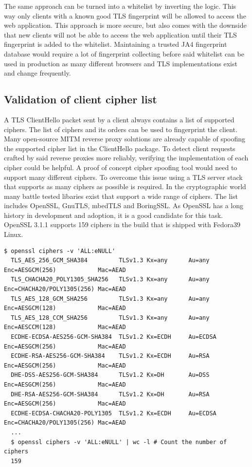 \documentclass[12pt]{scrbook}
\begin{document}
The same approach can be turned into a whitelist by inverting the logic. This
way only clients with a known good TLS fingerprint will be allowed to access the
web application. This approach is more secure, but also comes with the downside
that new clients will not be able to access the web application until their TLS
fingerprint is added to the whitelist. Maintaining a trusted JA4 fingerprint
database would require a lot of fingerprint collecting before said whitelist can
be used in production as many different browsers and TLS implementations exist
and change frequently.

\newpage \subsection{Validation of client cipher list} A TLS ClientHello packet sent
by a client always contains a list of supported ciphers. The list of ciphers
and its orders can be used to fingerprint the client. Many open-source MITM
reverse proxy solutions are already capable of spoofing the supported cipher
list in the ClientHello package. To detect client requests crafted by said reverse
proxies more reliably, verifying the implementation of each cipher could be
helpful. A proof of concept cipher spoofing tool would need to support many
different ciphers. To overcome this issue using a TLS server stack that
supports as many ciphers as possible is required. In the cryptographic world many battle tested
libaries exist that support a wide range of ciphers. The list includes OpenSSL, GnuTLS, mbedTLS and BoringSSL.
As OpenSSL has a long history in development and adoption, it is a good candidate for this task.
OpenSSL 3.1.1 supports 159 ciphers in the build that is shipped with Fedora39 Linux.

\begin{lstlisting}[breaklines=true,basicstyle=\tiny,caption={Listing supported ciphers and counting them in a shell},captionpos=b]
  $ openssl ciphers -v 'ALL:eNULL'
  TLS_AES_256_GCM_SHA384         TLSv1.3 Kx=any      Au=any   Enc=AESGCM(256)            Mac=AEAD
  TLS_CHACHA20_POLY1305_SHA256   TLSv1.3 Kx=any      Au=any   Enc=CHACHA20/POLY1305(256) Mac=AEAD
  TLS_AES_128_GCM_SHA256         TLSv1.3 Kx=any      Au=any   Enc=AESGCM(128)            Mac=AEAD
  TLS_AES_128_CCM_SHA256         TLSv1.3 Kx=any      Au=any   Enc=AESCCM(128)            Mac=AEAD
  ECDHE-ECDSA-AES256-GCM-SHA384  TLSv1.2 Kx=ECDH     Au=ECDSA Enc=AESGCM(256)            Mac=AEAD
  ECDHE-RSA-AES256-GCM-SHA384    TLSv1.2 Kx=ECDH     Au=RSA   Enc=AESGCM(256)            Mac=AEAD
  DHE-DSS-AES256-GCM-SHA384      TLSv1.2 Kx=DH       Au=DSS   Enc=AESGCM(256)            Mac=AEAD
  DHE-RSA-AES256-GCM-SHA384      TLSv1.2 Kx=DH       Au=RSA   Enc=AESGCM(256)            Mac=AEAD
  ECDHE-ECDSA-CHACHA20-POLY1305  TLSv1.2 Kx=ECDH     Au=ECDSA Enc=CHACHA20/POLY1305(256) Mac=AEAD
  ...
  $ openssl ciphers -v 'ALL:eNULL' | wc -l # Count the number of ciphers
  159
\end{lstlisting}
\end{document}
